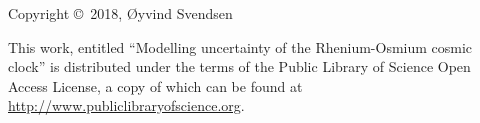 \documentclass[a4, 12pt, draft]{book}
\title{\mintittel}
\author{\O yvind Svendsen}
\date{01.06.18}
\newcommand{\mintittel}{Modelling uncertainty of the Rhenium-Osmium cosmic clock}
\begin{document}

\vspace*{18cm}
\noindent Copyright \copyright$\,$ 2018, \O yvind Svendsen
\vspace{4mm}

\noindent This work, entitled ``\mintittel'' is distributed under the
terms of the Public Library of Science Open Access License, a copy of which can be found at \url{http://www.publiclibraryofscience.org}. 

%
%










\end{document}
